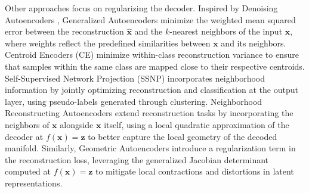 Other approaches focus on regularizing the decoder. Inspired by Denoising Autoencoders \cite{vincent2008extracting}, Generalized Autoencoders \cite{Wang2014gae} minimize the weighted mean squared error between the reconstruction \( \hat{\mathbf{x}} \) and the \( k \)-nearest neighbors of the input \( \mathbf{x} \), where weights reflect the predefined similarities between \( \mathbf{x} \) and its neighbors. Centroid Encoders (CE) \cite{Ghosh2022centroid} minimize within-class reconstruction variance to ensure that samples within the same class are mapped close to their respective centroids. Self-Supervised Network Projection (SSNP) \cite{espadoto2021ssnp} incorporates neighborhood information by jointly optimizing reconstruction and classification at the output layer, using pseudo-labels generated through clustering. Neighborhood Reconstructing Autoencoders \cite{LEE2021nrae} extend reconstruction tasks by incorporating the neighbors of \( \mathbf{x} \) alongside \( \mathbf{x} \) itself, using a local quadratic approximation of the decoder at \( f(\mathbf{x}) = \mathbf{z} \) to better capture the local geometry of the decoded manifold. Similarly, Geometric Autoencoders \cite{Nazari2023geometric} introduce a regularization term in the reconstruction loss, leveraging the generalized Jacobian determinant computed at \( f(\mathbf{x}) = \mathbf{z} \) to mitigate local contractions and distortions in latent representations.

